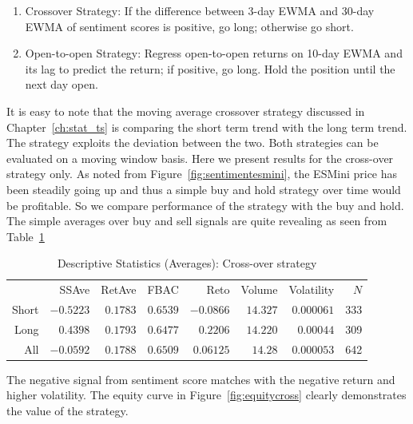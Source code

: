 \begin{enumerate}[1.]
\item Crossover Strategy: If the difference between 3-day EWMA and 30-day EWMA of sentiment scores is positive, go long; otherwise go short. 
\item Open-to-open Strategy: Regress open-to-open returns on 10-day EWMA and its lag to predict the return; if positive, go long. Hold the position until the next day open. 
\end{enumerate}


It is easy to note that the moving average crossover strategy discussed in Chapter~\ref{ch:stat_ts} is comparing the short term trend with the long term trend. The strategy exploits the deviation between the two. Both strategies can be evaluated on a moving window basis. Here we present results for the cross-over strategy only. As noted from Figure~\ref{fig:sentimentesmini}, the ESMini price has been steadily going up and thus a simple buy and hold strategy over time would be profitable. So we compare performance of the strategy with the buy and hold. The simple averages over buy and sell signals are quite revealing as seen from Table~\ref{tab:descstatcross}

        \begin{table}[!ht]
        \centering
        \caption{Descriptive Statistics (Averages): Cross-over strategy \label{tab:descstatcross}}
        \begin{tabular}{rrrrrrrr}
         & SSAve & RetAve & FBAC & Reto & Volume & Volatility & $N$ \\
        Short  & $-0.5223$ & $0.1783$ & $0.6539$ & $-0.0866$ & $14.327$ & $0.000061$ & 333 \\
         Long & $0.4398$ & $0.1793$ & $0.6477$ & $0.2206$ & $14.220$ & $0.00044$ & 309 \\
         All & $-0.0592$ & $0.1788$ & $0.6509$ & $0.06125$ & $14.28$ & $0.000053$ & 642
        \end{tabular} 
        \end{table}

The negative signal from sentiment score matches with the negative return and higher volatility. The equity curve in Figure~\ref{fig:equitycross} clearly demonstrates the value of the strategy. \\

